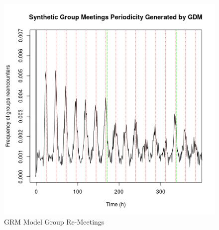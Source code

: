 \documentclass[10pt, conference, letterpaper]{IEEEtran}
\begin{document}






\begin{figure}[!t]
\centering
\includegraphics[width=\columnwidth]{best_periodicity.png}
\caption{GRM Model Group Re-Meetings}\label{GRM}
\end{figure}
\end{document}
